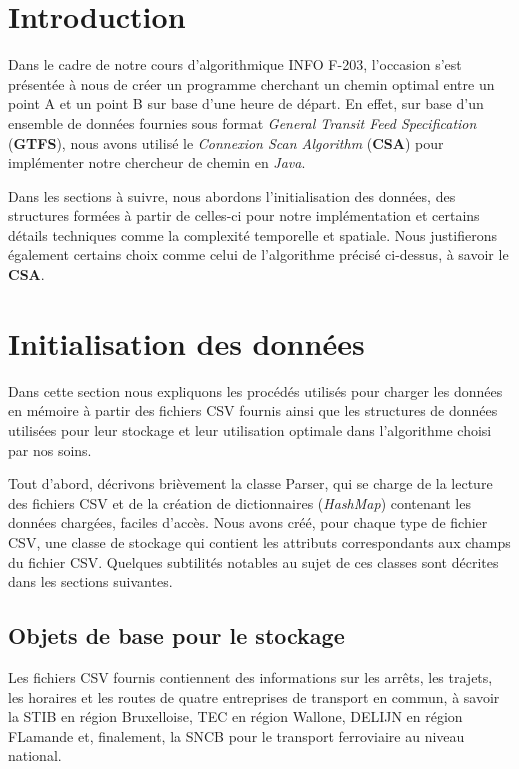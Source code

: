 \documentclass[12pt]{article}
\begin{document}
\clearpage


\tableofcontents

\newpage


\section{Introduction}
Dans le cadre de notre cours d'algorithmique INFO F-203, l'occasion s'est présentée à nous de créer un programme cherchant un chemin optimal
entre un point A et un point B sur base d'une heure de départ. En effet, sur base d'un ensemble de données
fournies sous format \emph{General Transit Feed Specification} (\textbf{GTFS}), nous avons utilisé le \emph{Connexion Scan Algorithm} (\textbf{CSA})
pour implémenter notre chercheur de chemin en \emph{Java}. 

Dans les sections à suivre, nous abordons l'initialisation des données, des structures formées à partir de celles-ci pour notre
implémentation et certains détails techniques comme la complexité temporelle et spatiale. Nous justifierons également certains choix
comme celui de l'algorithme précisé ci-dessus, à savoir le \textbf{CSA}.


\section{Initialisation des données}
Dans cette section nous expliquons les procédés utilisés pour charger les données en mémoire à partir des fichiers CSV fournis ainsi que
les structures de données utilisées pour leur stockage et leur utilisation optimale dans l'algorithme choisi par nos soins.

Tout d'abord, décrivons brièvement la classe Parser, qui se charge de la lecture des fichiers CSV et de la création de dictionnaires (\emph{HashMap}) contenant les données chargées, faciles d'accès.
Nous avons créé, pour chaque type de fichier CSV, une classe de stockage qui contient les attributs correspondants aux champs du fichier CSV. Quelques subtilités notables au sujet de ces classes sont
décrites dans les sections suivantes.

\subsection{Objets de base pour le stockage}
Les fichiers CSV fournis contiennent des informations sur les arrêts, les trajets, les horaires et les routes de quatre entreprises de transport en commun,
à savoir la STIB en région Bruxelloise, TEC en région Wallone, DELIJN en région FLamande et, finalement, la SNCB pour le transport ferroviaire au niveau national.
\end{document}
